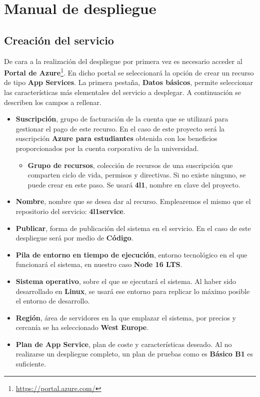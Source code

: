 \chapter{Manual de despliegue}
\label{ch:manual_despliegue}

\section{Creación del servicio}

De cara a la realización del despliegue por primera vez es necesario acceder al \textbf{Portal de Azure}\footnote{\href{https://portal.azure.com/}{https://portal.azure.com/}}. En dicho portal se seleccionará la opción de crear un recurso de tipo \textbf{App Services}. La primera pestaña, \textbf{Datos básicos}, permite seleccionar las características más elementales del servicio a desplegar. A continuación se describen los campos a rellenar.

\begin{itemize}
    \item \textbf{Suscripción}, grupo de facturación de la cuenta que se utilizará para gestionar el pago de este recurso. En el caso de este proyecto será la suscripción \textbf{Azure para estudiantes} obtenida con los beneficios proporcionados por la cuenta corporativa de la universidad.
    \begin{itemize}
        \item \textbf{Grupo de recursos}, colección de recursos de una suscripción que comparten ciclo de vida, permisos y directivas. Si no existe ninguno, se puede crear en este paso. Se usará \textbf{4l1}, nombre en clave del proyecto.
    \end{itemize}
    \item \textbf{Nombre}, nombre que se desea dar al recurso. Emplearemos el mismo que el repositorio del servicio: \textbf{4l1service}.
    \item \textbf{Publicar}, forma de publicación del sistema en el servicio. En el caso de este despliegue será por medio de \textbf{Código}.
    \item \textbf{Pila de entorno en tiempo de ejecución}, entorno tecnológico en el que funcionará el sistema, en nuestro caso \textbf{Node 16 LTS}.
    \item \textbf{Sistema operativo}, sobre el que se ejecutará el sistema. Al haber sido desarrollado en \textbf{Linux}, se usará ese entorno para replicar lo máximo posible el entorno de desarrollo.
    \item \textbf{Región}, área de servidores en la que emplazar el sistema, por precios y cercanía se ha seleccionado \textbf{West Europe}.
    \item \textbf{Plan de App Service}, plan de coste y características deseado. Al no realizarse un despliegue completo, un plan de pruebas como es \textbf{Básico B1} es suficiente.
\end{itemize}

